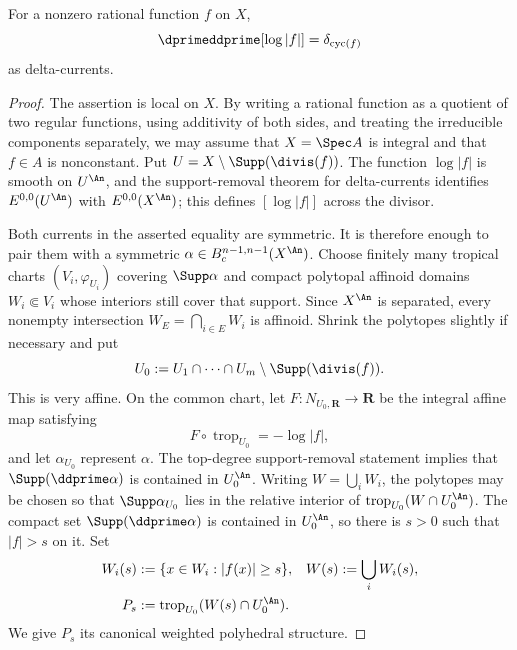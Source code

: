 \begin{theorem}\label{thm:gk-poincare-lelong}
For a nonzero rational function $f$ on $X$,
\[
                   \dprimeddprime[\log|f|]=\delta_{\operatorname{cyc}(f)}
\]
as delta-currents.
\end{theorem}
\begin{proof}
The assertion is local on $X$.  By writing a rational function as a quotient
of two regular functions, using additivity of both sides, and treating the
irreducible components separately, we may assume that $X=\Spec A$ is
integral and that $f\in A$ is nonconstant.  Put
$U=X\setminus\Supp(\divis(f))$.  The function $\log|f|$ is smooth on
$U^{\An}$, and the support-removal theorem for delta-currents identifies
$E^{0,0}(U^{\An})$ with $E^{0,0}(X^{\An})$; this defines
$[\log|f|]$ across the divisor.

Both currents in the asserted equality are symmetric.  It is therefore
enough to pair them with a symmetric
$\alpha\in B_c^{n-1,n-1}(X^{\An})$.  Choose finitely many tropical charts
$(V_i,\varphi_{U_i})$ covering $\Supp\alpha$ and compact polytopal affinoid
domains $W_i\Subset V_i$ whose interiors still cover that support.  Since
$X^{\An}$ is separated, every nonempty intersection
$W_E=\bigcap_{i\in E}W_i$ is affinoid.  Shrink the polytopes slightly if
necessary and put
\[
       U_0:=U_1\cap\cdots\cap U_m\setminus\Supp(\divis(f)).
\]
This is very affine.  On the common chart, let
$F:N_{U_0,\mathbf R}\to\mathbf R$ be the integral affine map satisfying
\[
 F\circ\operatorname{trop}_{U_0}=-\log|f|,
\]
and let $\alpha_{U_0}$ represent $\alpha$.  The top-degree support-removal
statement implies that $\Supp(\ddprime\alpha)$ is contained in $U_0^{\An}$.
Writing $W=\bigcup_iW_i$, the polytopes may be chosen so that
$\Supp\alpha_{U_0}$ lies in the relative interior of
$\operatorname{trop}_{U_0}(W\cap U_0^{\An})$.
The compact set $\Supp(\ddprime\alpha)$ is contained in $U_0^{\An}$, so
there is $s>0$ such that $|f|>s$ on it.  Set
\[
 \begin{aligned}
 W_i(s)&:=\{x\in W_i:|f(x)|\geq s\},&
 W(s)&:=\bigcup_iW_i(s),\\
 P_s&:=\operatorname{trop}_{U_0}(W(s)\cap U_0^{\An}).
 \end{aligned}
\]
We give $P_s$ its canonical weighted polyhedral structure.


\end{proof}
